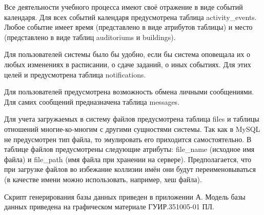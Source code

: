 Все деятельности учебного процесса имеют своё отражение в виде событий календаря. Для всех событий календаря предусмотрена таблица activity\_events. Любое событие имеет время (представлено в виде атрибутов таблицы) и место (представлено в виде таблиц auditoriums и buildings).

Для пользователей системы было бы удобно, если бы система оповещала их о любых изменениях в расписании, о сдаче заданий, о иных событиях. Для этих целей и предусмотрена таблица notifications.

Для пользователей предусмотрена возможность обмена личными сообщениями. Для самих сообщений предназначена таблица messages.

Для учета загружаемых в систему файлов предусмотрена таблица files и таблицы отношений многие-ко-многим с другими сущностями системы. Так как в MySQL не предусмотрен тип файла, то эмулировать его приходится самостоятельно. В таблице файлов предусмотрены следующие атрибуты: file\_name (исходное имя файла) и file\_path (имя файла при хранении на сервере). Предполагается, что при загрузке файлов во избежание коллизии имён они будут переименовываться (в качестве имени можно использовать, например, хеш файла).

Скрипт генерирования базы данных приведен в приложении А. Модель базы данных приведена на графическом материале ГУИР.351005-01 ПЛ.
